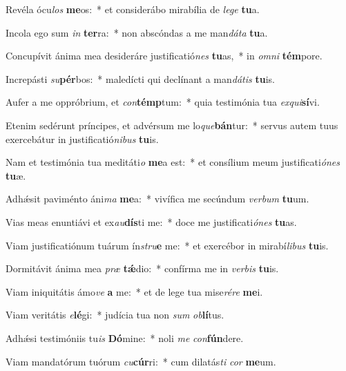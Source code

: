 \item Revéla ócu\textit{los} \textbf{me}os:~* et considerábo mirabília de \textit{le}\textit{ge} \textbf{tu}a.
\item Incola ego sum \textit{in} \textbf{ter}ra:~* non abscóndas a me man\textit{dá}\textit{ta} \textbf{tu}a.
\item Concupívit ánima mea desideráre justificatió\textit{nes} \textbf{tu}as,~* in \textit{om}\textit{ni} \textbf{tém}pore.
\item Increpásti \textit{su}\textbf{pér}bos:~* maledícti qui declínant a man\textit{dá}\textit{tis} \textbf{tu}is.
\item Aufer a me oppróbrium, et \textit{con}\textbf{témp}tum:~* quia testimónia tua \textit{ex}\textit{qui}\textbf{sí}vi.
\item Etenim sedérunt príncipes, et advérsum me lo\textit{que}\textbf{bán}tur:~* servus autem tuus exercebátur in justificatió\textit{ni}\textit{bus} \textbf{tu}is.
\item Nam et testimónia tua meditáti\textit{o} \textbf{me}a est:~* et consílium meum justificati\textit{ó}\textit{nes} \textbf{tu}æ.
\item Adhǽsit paviménto áni\textit{ma} \textbf{me}a:~* vivífica me secúndum \textit{ver}\textit{bum} \textbf{tu}um.
\item Vias meas enuntiávi et ex\textit{au}\textbf{dís}ti me:~* doce me justificati\textit{ó}\textit{nes} \textbf{tu}as.
\item Viam justificatiónum tuárum ín\textit{stru}\textbf{e} me:~* et exercébor in mirabí\textit{li}\textit{bus} \textbf{tu}is.
\item Dormitávit ánima mea \textit{præ} \textbf{tǽ}dio:~* confírma me in \textit{ver}\textit{bis} \textbf{tu}is.
\item Viam iniquitátis ámo\textit{ve} \textbf{a} me:~* et de lege tua mise\textit{ré}\textit{re} \textbf{me}i.
\item Viam veritátis \textit{e}\textbf{lé}gi:~* judícia tua non \textit{sum} \textit{ob}\textbf{lí}tus.
\item Adhǽsi testimóniis tu\textit{is} \textbf{Dó}mine:~* noli \textit{me} \textit{con}\textbf{fún}dere.
\item Viam mandatórum tuórum \textit{cu}\textbf{cúr}ri:~* cum dilatás\textit{ti} \textit{cor} \textbf{me}um.
